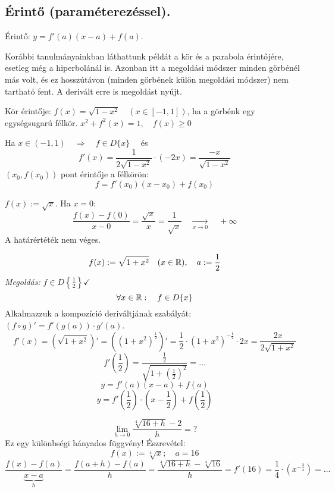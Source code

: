 \documentclass[a4paper,11.5pt]{article}
\begin{document}
	\subsection{Érintő (paraméterezéssel).}
	\begin{revision}
		Érintő: $y=f'(a)(x-a)+f(a)$.
	\end{revision}
	\begin{note}
		Korábbi tanulmányainkban láthattunk példát a kör és a parabola érintőjére, esetleg még a hiperbolánál is. Azonban itt a megoldási módszer minden görbénél más volt, és ez hosszútávon (minden görbének külön megoldási módszer) nem tartható fent. A derivált erre is megoldást nyújt.
	\end{note}
	\begin{task}
		Kör érintője: $f(x)=\sqrt{1-x^2}\quad (x\in[-1,1])$, ha a görbénk egy egységsugarú félkör. $x^2+f^2(x)=1,\quad f(x)\geq0$
		
		\medskip
		Ha $x\in(-1,1)\quad \Rightarrow\quad f\in D\{x\}\quad$ és
		\[ f'(x)=\frac{1}{2\sqrt{1-x^2}}\cdot(-2x)=\frac{-x}{\sqrt{1-x^2}} \]
		$(x_0, f(x_0))$ pont érintője a félkörön:
		\[ f=f'(x_0)(x-x_0)+f(x_0) \]
	\end{task}
	\begin{task}
		$f(x):=\sqrt{x}$. Ha $x=0$:
		\[ \frac{f(x)-f(0)}{x-0}=\frac{\sqrt{x}}{x}=\frac{1}{\sqrt{x}}\quad \underset{x\to0}{\longrightarrow}\quad +\infty \]
		A határértéték nem véges.
	\end{task}
	\begin{task}
		\[ f(x):=\sqrt{1+x^2}\quad (x\in\mathbb{R}),\quad a:=\frac{1}{2} \]
		\textit{Megoldás:} 
		$f\in D\left\{\frac{1}{2}\right\}\checkmark$
		\[ \forall x\in\mathbb{R}:\quad f\in D\{x\}\]
		Alkalmazzuk a kompozíció deriváltjának szabályát: $(f\circ g)'=f'(g(a))\cdot g'(a)$.
		\[ f'(x)= \left(\sqrt{1+x^2}\right)'=\left((1+x^2)^\frac{1}{2}\right)'=\frac{1}{2}\cdot\left(1+x^2\right)^{-\frac{1}{2}}\cdot2x=\frac{2x}{2\sqrt{1+x^2}} \]
		\[ f'\left(\frac{1}{2}\right)=\frac{\frac{1}{2}}{\sqrt{1+\left(\frac{1}{2}\right)^2}}=\ldots \]
		\[ y=f'(a)(x-a)+f(a) \]
		\[ y=f'\left(\frac{1}{2}\right)\cdot\left(x-\frac{1}{2}\right)+f\left(\frac{1}{2}\right) \] 
	\end{task}
	\begin{task}
		\[ \lim_{h\to0}\frac{\sqrt[4]{16+h}-2}{h}=? \]
		Ez egy különbségi hányados függvény! Észrevétel:
		\[ f(x):=\sqrt[4]{x};\quad a=16 \]
		\[ \frac{f(x)-f(a)}{\underbrace{x-a}_h}=\frac{f(a+h)-f(a)}{h}=\frac{\sqrt[4]{16+h}-\sqrt[4]{16}}{h}=f'(16)=\frac{1}{4}\cdot\left(x^{-\frac{3}{4}}\right)=\ldots \]
	\end{task}
\end{document}
